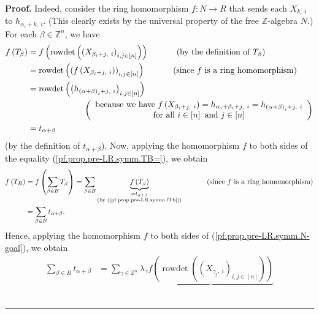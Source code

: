 \documentclass[numbers=enddot,12pt,final,onecolumn,notitlepage,english]{scrartcl}%
\theoremstyle{definition}
\newenvironment{proof}[1][Proof]{\noindent\textbf{#1.} }{\ \rule{0.5em}{0.5em}}
\let\sumnonlimits\sum
\renewcommand{\sum}{\sumnonlimits\limits}
\begin{document}
\begin{proof}
Indeed, consider the ring homomorphism $f:N\rightarrow R$ that sends each
$X_{k,\ i}$ to $h_{\alpha_{i}+k,\ i}$. (This clearly exists by the universal
property of the free $\mathbb{Z}$-algebra $N$.) For each $\beta\in
\mathbb{Z}^{n}$, we have%
\begin{align}
f\left(  T_{\beta}\right)   &  =f\left(  \operatorname*{rowdet}\left(  \left(
X_{\beta_{i}+j,\ i}\right)  _{i,j\in\left[  n\right]  }\right)  \right)
\ \ \ \ \ \ \ \ \ \ \left(  \text{by the definition of }T_{\beta}\right)
\nonumber\\
&  =\operatorname*{rowdet}\left(  \left(  f\left(  X_{\beta_{i}+j,\ i}\right)
\right)  _{i,j\in\left[  n\right]  }\right)  \ \ \ \ \ \ \ \ \ \ \left(
\text{since }f\text{ is a ring homomorphism}\right) \nonumber\\
&  =\operatorname*{rowdet}\left(  \left(  h_{\left(  \alpha+\beta\right)
_{i}+j,\ i}\right)  _{i,j\in\left[  n\right]  }\right) \nonumber\\
&  \ \ \ \ \ \ \ \ \ \ \ \ \ \ \ \ \ \ \ \ \left(
\begin{array}
[c]{c}%
\text{because we have }f\left(  X_{\beta_{i}+j,\ i}\right)  =h_{\alpha
_{i}+\beta_{i}+j,\ i}=h_{\left(  \alpha+\beta\right)  _{i}+j,\ i}\\
\text{for all }i\in\left[  n\right]  \text{ and }j\in\left[  n\right]
\end{array}
\right) \nonumber\\
&  =t_{\alpha+\beta} \label{pf.prop.pre-LR.symm.fTb}%
\end{align}
(by the definition of $t_{\alpha+\beta}$). Now, applying the homomorphism $f$
to both sides of the equality (\ref{pf.prop.pre-LR.symm.TB=}), we obtain%
\begin{align*}
f\left(  T_{B}\right)   &  =f\left(  \sum_{\beta\in B}T_{\beta}\right)
=\sum_{\beta\in B}\underbrace{f\left(  T_{\beta}\right)  }%
_{\substack{=t_{\alpha+\beta}\\\text{(by (\ref{pf.prop.pre-LR.symm.fTb}))}%
}}\ \ \ \ \ \ \ \ \ \ \left(  \text{since }f\text{ is a ring homomorphism}%
\right) \\
&  =\sum_{\beta\in B}t_{\alpha+\beta}.
\end{align*}
Hence, applying the homomorphism $f$ to both sides of
(\ref{pf.prop.pre-LR.symm.N-goal}), we obtain%
\begin{align*}
\sum_{\beta\in B}t_{\alpha+\beta}  &  =\sum_{\gamma\in\mathbb{Z}^{n}}%
\lambda_{\gamma}\underbrace{f\left(  \operatorname*{rowdet}\left(  \left(
X_{\gamma_{j},\ i}\right)  _{i,j\in\left[  n\right]  }\right)  \right)
}
\end{align*}
\end{proof}
\end{document}
